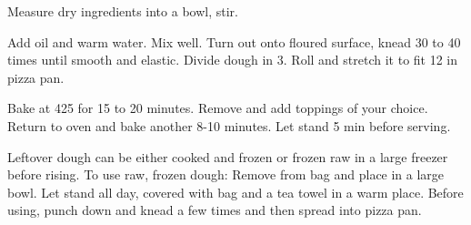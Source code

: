 Measure dry ingredients into a bowl, stir. 

Add oil and warm water.  Mix well. 
Turn out onto floured surface, knead 30 to 40 times until smooth and elastic.
Divide dough in 3.  Roll and stretch it to fit 12 in pizza pan.  

Bake at 425 for 15 to 20 minutes. 
Remove and add toppings of your choice.  
Return to oven and bake another 8-10 minutes.  
Let stand 5 min before serving.

Leftover dough can be either cooked and frozen or frozen raw in a large freezer before rising.  
To use raw, frozen dough:  Remove from bag and place in a large bowl. 
Let stand all day, covered with bag and a tea towel in a warm place.  
Before using, punch down and knead a few times and then spread into pizza pan.